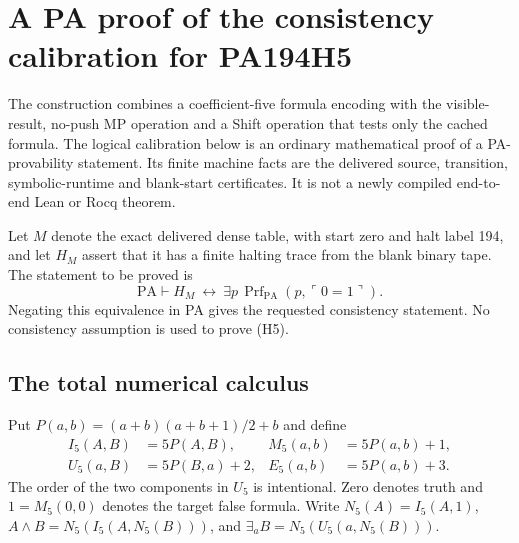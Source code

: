 \section{A PA proof of the consistency calibration for PA194H5}
\label{sec:h5-calibration}

The construction combines a coefficient-five formula encoding with the
visible-result, no-push MP operation and a Shift operation that tests only
the cached formula. The logical calibration below is an ordinary
mathematical proof of a PA-provability statement. Its finite machine facts
are the delivered source, transition, symbolic-runtime and blank-start
certificates. It is not a newly compiled end-to-end Lean or Rocq theorem.

Let $M$ denote the exact delivered dense table, with start zero and halt
label 194, and let $H_M$ assert that it has a finite halting trace from the
blank binary tape. The statement to be proved is
\[
 \mathrm{PA}\vdash
 H_M\ \longleftrightarrow\
 \exists p\,\operatorname{Prf}_{\mathrm{PA}}(p,\ulcorner0=1\urcorner).
 \tag{H5}
\]
Negating this equivalence in PA gives the requested consistency statement.
No consistency assumption is used to prove (H5).

\subsection{The total numerical calculus}

Put $P(a,b)=(a+b)(a+b+1)/2+b$ and define
\[
\begin{aligned}
 I_5(A,B)&=5P(A,B),&M_5(a,b)&=5P(a,b)+1,\\
 U_5(a,B)&=5P(B,a)+2,&E_5(a,b)&=5P(a,b)+3.
\end{aligned}
\]
The order of the two components in $U_5$ is intentional. Zero denotes
truth and $1=M_5(0,0)$ denotes the target false formula. Write
$N_5(A)=I_5(A,1)$, $A\wedge B=N_5(I_5(A,N_5(B)))$, and
$\exists_a B=N_5(U_5(a,N_5(B)))$.

